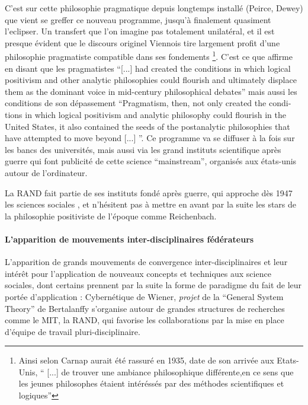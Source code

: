 C'est sur cette philosophie pragmatique depuis longtemps installé (Peirce, Dewey) que vient se greffer ce nouveau programme, jusqu'à finalement quasiment l'eclipser. Un transfert que l'on imagine pas totalement unilatéral, et il est presque évident que le discours originel Viennois tire largement profit d'une philosophie pragmatiste compatible dans ses fondements \footnote{ Ainsi selon \textcite[149]{Ouelbani2006} Carnap aurait été rassuré en 1935, date de son arrivée aux Etats-Unis, \enquote{ [...] de trouver une ambiance philosophique différente,en ce sens que les jeunes philosophes étaient intéréssés par des méthodes scientifiques et logiques}}. C'est ce que \textcite[123]{Wilson1995} affirme en disant que les pragmatistes \foreignquote{english}{[...] had created the conditions in which logical positivism and other analytic philosophies could flourish and ultimately displace them as the dominant voice in mid-century philosophical debates} mais aussi les conditions de son dépassement \foreignquote{english}{Pragmatism, then, not only created the conditions in which logical positivism and analytic philosophy could flourish in the United States, it also contained the seeds of the postanalytic philosophies that have attempted to move beyond [...] }. Ce programme va se diffuser à la fois sur les bancs des universités, mais aussi via les grand instituts scientifique après guerre qui font publicité de cette science \foreignquote{english}{mainstream}, organisés aux états-unis autour de l'ordinateur. 

La RAND fait partie de ses instituts fondé après guerre, qui approche dès 1947 les sciences sociales \autocite{Rand106}, et n'hésitent pas à mettre en avant par la suite les stars de la philosophie positiviste de l'époque comme Reichenbach. \autocite[384-385]{Barnes2011} 

\paragraph{L'apparition de mouvements inter-disciplinaires fédérateurs}

L'apparition de grands mouvements de convergence inter-disciplinaires et leur intérêt pour l'application de nouveaux concepts et techniques aux science sociales, dont certains prennent par la suite la forme de paradigme du fait de leur portée d'application : Cybernétique de Wiener, \textit{projet} de la \foreignquote{english}{General System Theory} de Bertalanffy \autocite[9]{Pouvreau2013} s'organise autour de grandes structures de recherches comme le MIT, la RAND, qui favorise les collaborations par la mise en place d'équipe de travail pluri-disciplinaire.


